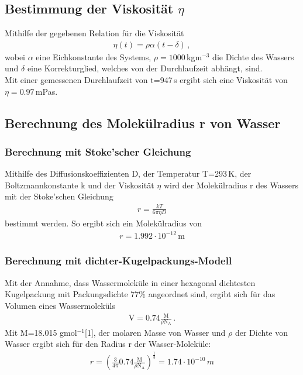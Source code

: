 \documentclass[]{scrartcl}
\begin{document}
\subsection{Bestimmung der Viskosität $\eta$}
Mithilfe der gegebenen Relation für die Viskosität
\begin{align*}
\eta(t)=\rho \alpha (t-\delta)\, ,
\end{align*}
wobei $\alpha$ eine Eichkonstante des Systems, $\rho=1000$\,kgm$^{-3}$ die Dichte des Wassers und $\delta$ eine Korrekturglied, welches von der Durchlaufzeit abhängt, sind. \\
Mit einer gemessenen Durchlaufzeit von t=947\,s ergibt sich eine Viskosität von $\eta=0.97$\,mPas.
\subsection{Berechnung des Molekülradius r von Wasser}
\subsubsection{Berechnung mit Stoke'scher Gleichung}
Mithilfe des Diffusionskoeffizienten D, der Temperatur T=293\,K, der Boltzmannkonstante k und der Viskosität $\eta$ wird der Molekülradius r des Wassers mit der Stoke'schen Gleichung
\begin{align*}
r=\frac{kT}{6\pi \eta D}
\end{align*}
bestimmt werden. So ergibt sich ein Molekülradius von
\begin{align*}
r = 1.992\cdot10^{-12}\,\text{m}
\end{align*}
\subsubsection{Berechnung mit dichter-Kugelpackungs-Modell}
Mit der Annahme, dass Wassermoleküle in einer hexagonal dichtesten Kugelpackung mit Packungsdichte 77\% angeordnet sind, ergibt sich für das Volumen eines Wassermoleküls
\begin{align*}
\text{V}=0.74 \frac{\text{M}}{\rho \text{N}_{\text{A}}}\,.
\end{align*}
Mit M=18.015 gmol$^{-1}$[1], der molaren Masse von Wasser und $\rho$ der Dichte von Wasser ergibt sich für den Radius r der Wasser-Moleküle:
\begin{align*}
r = \left( \frac{3}{4\pi}0.74\frac{\text{M}}{\rho \text{N}_{\text{A}}}\right)^{\frac{1}{3}}=1.74\cdot10^{-10}\,m
\end{align*}
\end{document}
